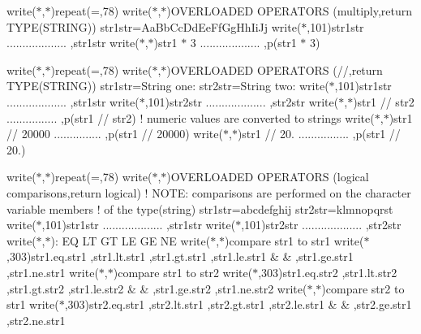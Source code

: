 write($\ast$,$\ast$)repeat(\textquotesingle{}=\textquotesingle{},78) write($\ast$,$\ast$)\textquotesingle{}O\+V\+E\+R\+L\+O\+A\+D\+ED O\+P\+E\+R\+A\+T\+O\+RS (multiply,return T\+Y\+P\+E(\+S\+T\+R\+I\+N\+G))\textquotesingle{} str1str=\textquotesingle{}Aa\+Bb\+Cc\+Dd\+Ee\+Ff\+Gg\+Hh\+Ii\+Jj\textquotesingle{} write($\ast$,101)\textquotesingle{}str1str ................... \textquotesingle{},str1str write($\ast$,$\ast$)\textquotesingle{}str1 $\ast$ 3 ................... \textquotesingle{},p(str1 $\ast$ 3)

write($\ast$,$\ast$)repeat(\textquotesingle{}=\textquotesingle{},78) write($\ast$,$\ast$)\textquotesingle{}O\+V\+E\+R\+L\+O\+A\+D\+ED O\+P\+E\+R\+A\+T\+O\+RS (//,return T\+Y\+P\+E(\+S\+T\+R\+I\+N\+G))\textquotesingle{} str1str=\textquotesingle{}String one\+:\textquotesingle{} str2str=\textquotesingle{}String two\+:\textquotesingle{} write($\ast$,101)\textquotesingle{}str1str ................... \textquotesingle{},str1str write($\ast$,101)\textquotesingle{}str2str ................... \textquotesingle{},str2str write($\ast$,$\ast$)\textquotesingle{}str1 // str2 ................ \textquotesingle{},p(str1 // str2) ! numeric values are converted to strings write($\ast$,$\ast$)\textquotesingle{}str1 // 20000 ............... \textquotesingle{},p(str1 // 20000) write($\ast$,$\ast$)\textquotesingle{}str1 // 20. ................ \textquotesingle{},p(str1 // 20.)

write($\ast$,$\ast$)repeat(\textquotesingle{}=\textquotesingle{},78) write($\ast$,$\ast$)\textquotesingle{}O\+V\+E\+R\+L\+O\+A\+D\+ED O\+P\+E\+R\+A\+T\+O\+RS (logical comparisons,return logical)\textquotesingle{} ! N\+O\+TE\+: comparisons are performed on the character variable members ! of the type(string) str1str=\textquotesingle{}abcdefghij\textquotesingle{} str2str=\textquotesingle{}klmnopqrst\textquotesingle{} write($\ast$,101)\textquotesingle{}str1str ................... \textquotesingle{},str1str write($\ast$,101)\textquotesingle{}str2str ................... \textquotesingle{},str2str write($\ast$,$\ast$)\textquotesingle{}\+: EQ LT GT LE GE NE\textquotesingle{} write($\ast$,$\ast$)\textquotesingle{}compare str1 to str1\textquotesingle{} write($\ast$,303)str1.\+eq.\+str1 ,str1.\+lt.\+str1 ,str1.\+gt.\+str1 ,str1.\+le.\+str1 \& \& ,str1.\+ge.\+str1 ,str1.\+ne.\+str1 write($\ast$,$\ast$)\textquotesingle{}compare str1 to str2\textquotesingle{} write($\ast$,303)str1.\+eq.\+str2 ,str1.\+lt.\+str2 ,str1.\+gt.\+str2 ,str1.\+le.\+str2 \& \& ,str1.\+ge.\+str2 ,str1.\+ne.\+str2 write($\ast$,$\ast$)\textquotesingle{}compare str2 to str1\textquotesingle{} write($\ast$,303)str2.\+eq.\+str1 ,str2.\+lt.\+str1 ,str2.\+gt.\+str1 ,str2.\+le.\+str1 \& \& ,str2.\+ge.\+str1 ,str2.\+ne.\+str1

